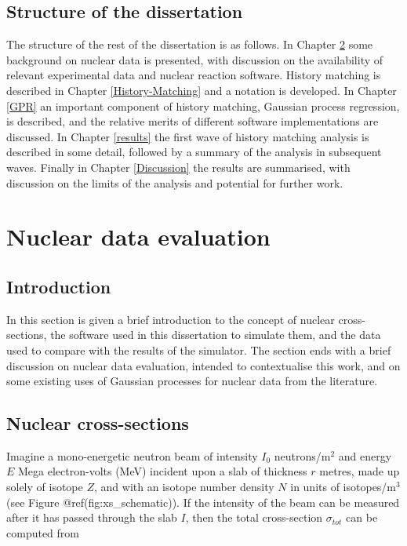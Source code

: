 \documentclass[
  12pt,
  a4paper,
  twoside]{book}
\begin{document}
\hypertarget{structure-of-the-dissertation}{%
\section{Structure of the dissertation}\label{structure-of-the-dissertation}}

The structure of the rest of the dissertation is as follows. In Chapter \ref{Background} some background on nuclear data is presented, with discussion on the availability of relevant experimental data and nuclear reaction software. History matching is described in Chapter \ref{History-Matching} and a notation is developed. In Chapter \ref{GPR} an important component of history matching, Gaussian process regression, is described, and the relative merits of different software implementations are discussed. In Chapter \ref{results} the first wave of history matching analysis is described in some detail, followed by a summary of the analysis in subsequent waves. Finally in Chapter \ref{Discussion} the results are summarised, with discussion on the limits of the analysis and potential for further work.

\hypertarget{Background}{%
\chapter{Nuclear data evaluation}\label{Background}}

\hypertarget{introduction-1}{%
\section{Introduction}\label{introduction-1}}

In this section is given a brief introduction to the concept of nuclear cross-sections, the software used in this dissertation to simulate them, and the data used to compare with the results of the simulator. The section ends with a brief discussion on nuclear data evaluation, intended to contextualise this work, and on some existing uses of Gaussian processes for nuclear data from the literature.

\hypertarget{Background:xs}{%
\section{Nuclear cross-sections}\label{Background:xs}}

Imagine a mono-energetic neutron beam of intensity \(I_0\) neutrons/m\(^2\) and energy \(E\) Mega electron-volts (MeV) incident upon a slab of thickness \(r\) metres, made up solely of isotope \(Z\), and with an isotope number density \(N\) in units of isotopes/m\(^3\) (see Figure @ref(fig:xs\_schematic)). If the intensity of the beam can be measured after it has passed through the slab \(I\), then the total cross-section \(\sigma_{tot}\) can be computed from
\end{document}
